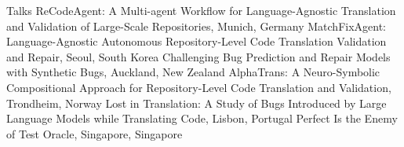 \newcommand{\talkvideo}[1]{\href{#1}{\textcolor{UrlColor}{\faYoutube}}}
\begin{rubric}{Talks}
\entry*[ASE'26]
ReCodeAgent: A Multi-agent Workflow for Language-Agnostic Translation and Validation of Large-Scale Repositories, Munich, Germany \talkvideo{https://youtu.be/jgR2ghgceGo}
\entry*[ICML'26]
MatchFixAgent: Language-Agnostic Autonomous Repository-Level Code Translation Validation and Repair, Seoul, South Korea \talkvideo{https://youtu.be/-xtMuOZmE40}
\entry*[SCAM'25]
Challenging Bug Prediction and Repair Models with Synthetic Bugs, Auckland, New Zealand \talkvideo{https://youtu.be/ST35dyCmBMM}
\entry*[FSE'25]
AlphaTrans: A Neuro-Symbolic Compositional Approach for Repository-Level Code Translation and Validation, Trondheim, Norway \talkvideo{https://youtu.be/k1uC8hvqY2M}
\entry*[ICSE'24]
Lost in Translation: A Study of Bugs Introduced by Large Language Models while Translating Code, Lisbon, Portugal \talkvideo{https://www.youtube.com/watch?v=t-7oWaipiso}
\entry*[FSE'22]
Perfect Is the Enemy of Test Oracle, Singapore, Singapore \talkvideo{https://www.youtube.com/watch?v=k9060RSH0hg}
\end{rubric}
